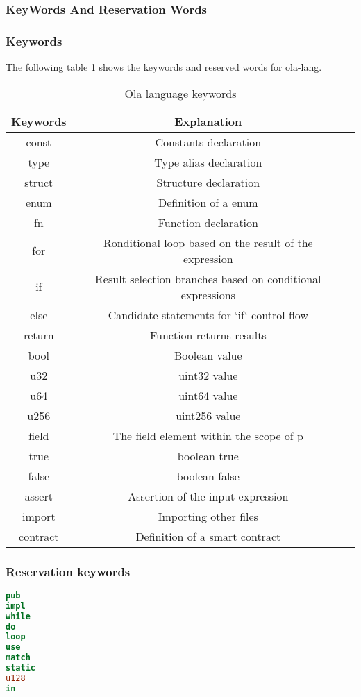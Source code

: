 \subsubsection{KeyWords And Reservation Words }

\subsubsection*{Keywords} 

The following table \ref{table: ola-lang-keywords} shows the keywords and reserved words for ola-lang.

\begin{table}[!ht]
\centering
\begin{tabular}{c|c|c}
\textbf{Keywords} & \textbf{Explanation} \\ \hline
const & Constants declaration \\
type & Type alias declaration \\
struct & Structure declaration \\
enum & Definition of a enum \\
fn & Function declaration \\
for & Ronditional loop based on the result of the expression \\
if & Result selection branches based on conditional expressions \\
else & Candidate statements for `if` control flow \\
return & Function returns results \\
bool & Boolean value \\
u32 & uint32 value \\
u64 & uint64 value \\
u256 & uint256 value \\
field & The field element within the scope of p \\
true & boolean true \\
false & boolean false \\
assert & Assertion of the input expression \\
import & Importing other files \\
contract & Definition of a smart contract \\
\end{tabular}
\caption{Ola language keywords}
\label{table: ola-lang-keywords}
\end{table}

\subsubsection*{Reservation keywords}

\begin{lstlisting}[language=Rust]
pub
impl
while
do
loop
use
match
static
u128
in
\end{lstlisting}
    